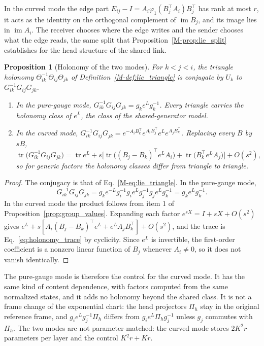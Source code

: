 \documentclass[11pt]{article}
\newtheorem{proposition}[theorem]{Proposition}
\theoremstyle{definition}
\theoremstyle{remark}
\providecommand{\tr}{\operatorname{tr}}
\newcommand{\Mref}[1]{\ref{M-#1}}
\begin{document}
In the curved mode the edge part $E_{ij}-I=A_i\varphi_1(B_j^\top A_i)B_j^\top$ has rank at most $r$, it acts as the identity on the orthogonal complement of $\operatorname{im}B_j$, and its image lies in $\operatorname{im}A_i$. The receiver chooses where the edge writes and the sender chooses what the edge reads, the same split that Proposition~\Mref{prop:lie_split} establishes for the head structure of the shared link.

\begin{proposition}[Holonomy of the two modes]
\label{prop:edge_holonomy}
For $k<j<i$, the triangle holonomy $\Theta_{ik}^{-1}\Theta_{ij}\Theta_{jk}$ of Definition~\Mref{def:lie_triangle} is conjugate by $U_k$ to $G_{ik}^{-1}G_{ij}G_{jk}$.
\begin{enumerate}
\item In the pure-gauge mode, $G_{ik}^{-1}G_{ij}G_{jk}=g_ke^{L}g_k^{-1}$. Every triangle carries the holonomy class of $e^{L}$, the class of the shared-generator model.
\item In the curved mode, $G_{ik}^{-1}G_{ij}G_{jk}=e^{-A_iB_k^\top}e^{A_iB_j^\top}e^{L}e^{A_jB_k^\top}$. Replacing every $B$ by $sB$,
\begin{equation}
\tr\bigl(G_{ik}^{-1}G_{ij}G_{jk}\bigr)=\tr e^{L}+s\bigl[\tr\bigl((B_j-B_k)^\top e^{L}A_i\bigr)+\tr\bigl(B_k^\top e^{L}A_j\bigr)\bigr]+O(s^2),
\label{eq:holonomy_trace}
\end{equation}
so for generic factors the holonomy classes differ from triangle to triangle.
\end{enumerate}
\end{proposition}
\begin{proof}
The conjugacy is that of Eq.~\Mref{eq:lie_triangle}. In the pure-gauge mode,
\begin{equation*}
G_{ik}^{-1}G_{ij}G_{jk}=g_ke^{-L}g_i^{-1}g_ie^{L}g_j^{-1}g_je^{L}g_k^{-1}=g_ke^{L}g_k^{-1}.
\end{equation*}
 In the curved mode the product follows from item 1 of Proposition~\ref{prop:group_values}. Expanding each factor $e^{sX}=I+sX+O(s^2)$ gives $e^{L}+s[A_i(B_j-B_k)^\top e^{L}+e^{L}A_jB_k^\top]+O(s^2)$, and the trace is Eq.~\eqref{eq:holonomy_trace} by cyclicity. Since $e^{L}$ is invertible, the first-order coefficient is a nonzero linear function of $B_j$ whenever $A_i\ne0$, so it does not vanish identically.
\end{proof}

The pure-gauge mode is therefore the control for the curved mode. It has the same kind of content dependence, with factors computed from the same normalized states, and it adds no holonomy beyond the shared class. It is not a frame change of the exponential chart: the head projectors $\Pi_h$ stay in the original reference frame, and $g_ie^{L}g_j^{-1}\Pi_h$ differs from $g_ie^{L}\Pi_hg_j^{-1}$ unless $g_j$ commutes with $\Pi_h$. The two modes are not parameter-matched: the curved mode stores $2K^2r$ parameters per layer and the control $K^2r+Kr$.
\end{document}
